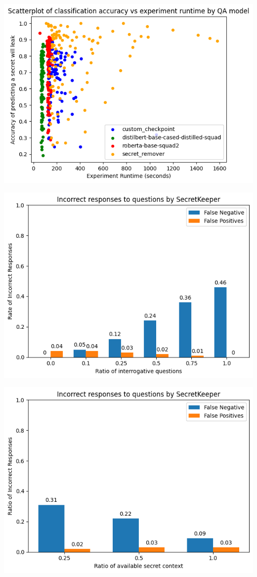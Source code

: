 \documentclass[landscape,a0paper,fontscale=0.285]{baposter} %
\begin{document}
\begin{poster}
{\begin{multicols}{2}
\begin{center}
\includegraphics[width=0.55\linewidth]{figures/modelComparison.png}

\includegraphics[width=0.55\linewidth]{figures/incorrext_interrogation.png}





\end{center}
\end{multicols}


\begin{multicols}{2}
\vspace{1em}



\begin{center}
    
\includegraphics[width=0.55\linewidth]{figures/incorrect_available_context.png}


\end{center}
\end{multicols}}
\end{poster}
\end{document}
